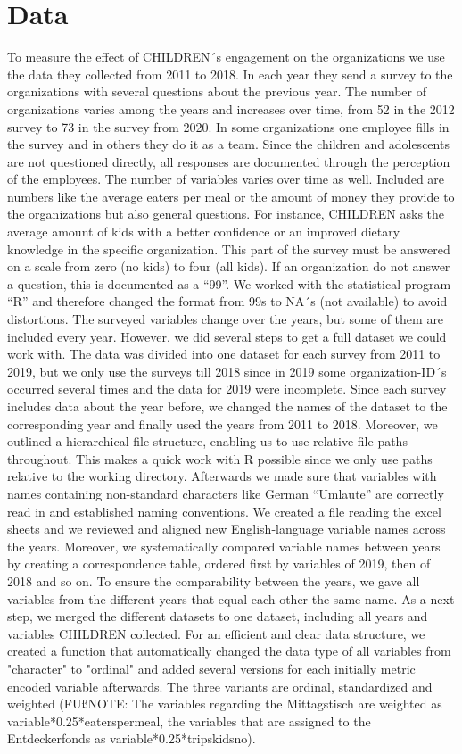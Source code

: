 \documentclass[12pt, a4paper, titlepage]{article}\usepackage[]{graphicx}\usepackage[]{color}
\begin{document}
\section{Data}

To measure the effect of CHILDREN´s engagement on the organizations we use the data they collected from 2011 to 2018. In each year they send a survey to the organizations with several questions about the previous year. The number of organizations varies among the years and increases over time, from 52 in the 2012 survey to 73 in the survey from 2020. In some organizations one employee fills in the survey and in others they do it as a team. Since the children and adolescents are not questioned directly, all responses are documented through the perception of the employees. The number of variables varies over time as well. Included are numbers like the average eaters per meal or the amount of money they provide to the organizations but also general questions. For instance, CHILDREN asks the average amount of kids with a better confidence or an improved dietary knowledge in the specific organization. This part of the survey must be answered on a scale from zero (no kids) to four (all kids). If an organization do not answer a question, this is documented as a “99”. We worked with the statistical program “R” and therefore changed the format from 99s to NA´s (not available) to avoid distortions. The surveyed variables change over the years, but some of them are included every year. 
However, we did several steps to get a full dataset we could work with. The data was divided into one dataset for each survey from 2011 to 2019, but we only use the surveys till 2018 since in 2019 some organization-ID´s occurred several times and the data for 2019 were incomplete. Since each survey includes data about the year before, we changed the names of the dataset to the corresponding year and finally used the years from 2011 to 2018. Moreover, we outlined a hierarchical file structure, enabling us to use relative file paths throughout. This makes a quick work with R possible since we only use paths relative to the working directory. Afterwards we made sure that variables with names containing non-standard characters like German “Umlaute” are correctly read in and established naming conventions. We created a file reading the excel sheets and we reviewed and aligned new English-language variable names across the years. Moreover, we systematically compared variable names between years by creating a correspondence table, ordered first by variables of 2019, then of 2018 and so on. To ensure the comparability between the years, we gave all variables from the different years that equal each other the same name. As a next step, we merged the different datasets to one dataset, including all years and variables CHILDREN collected. For an efficient and clear data structure, we created a function that automatically changed the data type of all variables from "character" to "ordinal" and added several versions for each initially metric encoded variable afterwards. The three variants are ordinal, standardized and weighted (FUßNOTE: The variables regarding the Mittagstisch are weighted as variable*0.25*eaterspermeal, the variables that are assigned to the Entdeckerfonds as variable*0.25*tripskidsno). 
\end{document}
